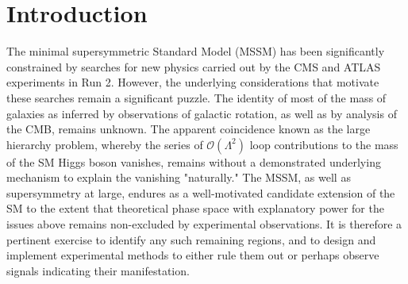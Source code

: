 \clearpage
\section{Introduction}

The minimal supersymmetric Standard Model (MSSM) has been significantly constrained by searches for new physics carried out by the CMS and ATLAS experiments in Run 2. However, the underlying considerations that motivate these searches remain a significant puzzle. The identity of most of the mass of galaxies as inferred by observations of galactic rotation, as well as by analysis of the CMB, remains unknown. The apparent coincidence known as the large hierarchy problem, whereby the series of $\mathcal{O}(\Lambda^2)$ loop contributions to the mass of the SM Higgs boson vanishes, remains without a demonstrated underlying mechanism to explain the vanishing "naturally." The MSSM, as well as supersymmetry at large, endures as a well-motivated candidate extension of the SM to the extent that theoretical phase space with explanatory power for the issues above remains non-excluded by experimental observations. It is therefore a pertinent exercise to identify any such remaining regions, and to design and implement experimental methods to either rule them out or perhaps observe signals indicating their manifestation. 

